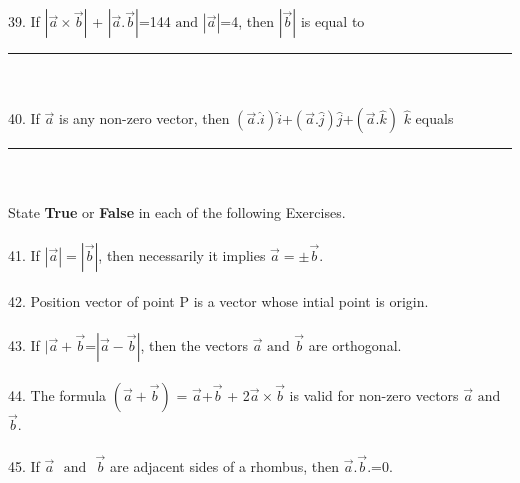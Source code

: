 \documentclass{article}
\begin{document}
\\
\\
39. If $|\vec{a}\times\vec{b}|$ + $|\vec{a}.\vec{b}|$=144 $\text{and}$  $|\vec{a}|$=4, then $|\vec{b}|$ is equal to \rule{1cm}{0.15mm}
\\
\\
40. If $\vec{a}$ is  any non-zero vector, then $(\vec{a}.\hat{i})\hat{i}$+$(\vec{a}.\hat{j})\hat{j}$+$(\vec{a}.\hat{k})$ $\hat{k}$ equals \rule{1cm}{0.15mm}
\\
\\
State \textbf{True} or \textbf{False} in each of the following Exercises.
\\
\\
41. If $|\vec{a}|=|\vec{b}|$, then necessarily it implies $\vec{a}=\pm\vec{b}$.
\\
\\
42. Position vector of point P is a vector whose intial point is origin.
\\
\\
43. If $|\vec{a}+\vec{b}$=$|\vec{a}-\vec{b}|$, then the vectors $\vec{a}$ $\text {and}$ $\vec{b}$ are orthogonal.
\\
\\
44. The formula $(\vec{a}+\vec{b})$ = $\vec{a}$+$\vec{b}$ + 2$\vec{a}\times\vec{b}$ is valid for non-zero vectors $\vec{a}$ $\text{and}$ $\vec{b}$.
\\
\\
45. If $\vec{a}$ $\text{ and }$ $\vec{b}$ are adjacent sides of a rhombus, then $\vec{a}.\vec{b}$.=0.
\end{document}
